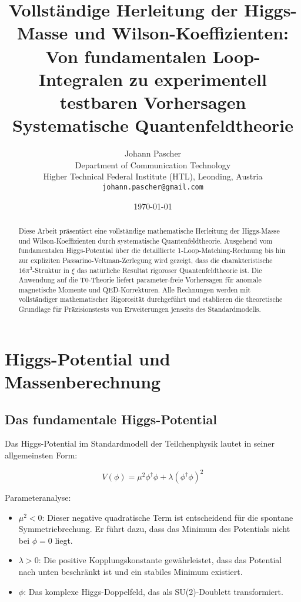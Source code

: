 \documentclass[12pt,a4paper]{article}
\title{Vollständige Herleitung der Higgs-Masse und Wilson-Koeffizienten:\\Von fundamentalen Loop-Integralen zu experimentell testbaren Vorhersagen\\
	\large Systematische Quantenfeldtheorie}
\author{Johann Pascher\\
	Department of Communication Technology\\
	Higher Technical Federal Institute (HTL), Leonding, Austria\\
	\texttt{johann.pascher@gmail.com}}
\date{\today}
\theoremstyle{definition}
\begin{document}
	
	\maketitle
	
	\begin{abstract}
		Diese Arbeit präsentiert eine vollständige mathematische Herleitung der Higgs-Masse und Wilson-Koeffizienten durch systematische Quantenfeldtheorie. Ausgehend vom fundamentalen Higgs-Potential über die detaillierte 1-Loop-Matching-Rechnung bis hin zur expliziten Passarino-Veltman-Zerlegung wird gezeigt, dass die charakteristische $16\pi^3$-Struktur in $\xi$ das natürliche Resultat rigoroser Quantenfeldtheorie ist. Die Anwendung auf die T0-Theorie liefert parameter-freie Vorhersagen für anomale magnetische Momente und QED-Korrekturen. Alle Rechnungen werden mit vollständiger mathematischer Rigorosität durchgeführt und etablieren die theoretische Grundlage für Präzisionstests von Erweiterungen jenseits des Standardmodells.
	\end{abstract}
	
	\tableofcontents
	\newpage
	
	\section{Higgs-Potential und Massenberechnung}
	
	\subsection{Das fundamentale Higgs-Potential}
	
	Das Higgs-Potential im Standardmodell der Teilchenphysik lautet in seiner allgemeinsten Form:
	
	\begin{equation}
		V(\phi) = \mu^2 \phi^\dagger\phi + \lambda(\phi^\dagger\phi)^2
	\end{equation}
	
	\begin{wichtig}
		Parameteranalyse:
		\begin{itemize}
			\item $\mu^2 < 0$: Dieser negative quadratische Term ist entscheidend für die spontane Symmetriebrechung. Er führt dazu, dass das Minimum des Potentials nicht bei $\phi = 0$ liegt.
			\item $\lambda > 0$: Die positive Kopplungskonstante gewährleistet, dass das Potential nach unten beschränkt ist und ein stabiles Minimum existiert.
			\item $\phi$: Das komplexe Higgs-Doppelfeld, das als SU(2)-Doublett transformiert.
		\end{itemize}
	\end{wichtig}
	
\end{document}
